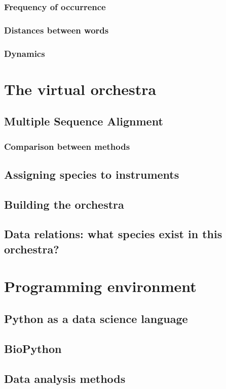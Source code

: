 \documentclass[11pt,twoside,a4paper]{report}
\begin{document}
\subsection{Frequency of occurrence}
\subsection{Distances between words}
\subsection{Dynamics}

\chapter{The virtual orchestra}
\section{Multiple Sequence Alignment}
\subsection{Comparison between methods}
\section{Assigning species to instruments}
\section{Building the orchestra}
\section{Data relations: what species exist in this orchestra?}

\chapter{Programming environment}
\section{Python as a data science language}
\section{BioPython}
\section{Data analysis methods}
\end{document}
